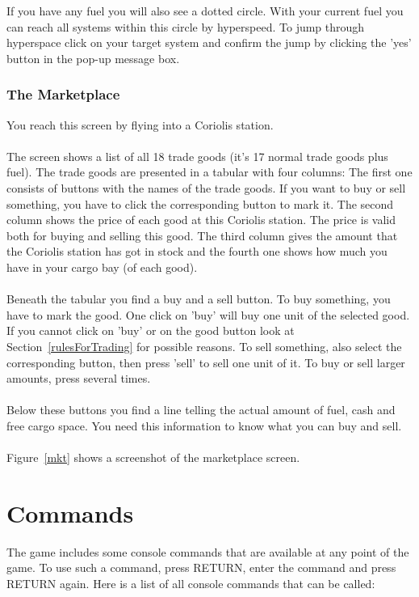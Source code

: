 \documentclass[a4paper,11pt]{article}
\begin{document}
If you have any fuel you will also see a dotted circle. With your current fuel you can reach all systems within this circle by hyperspeed. To jump through hyperspace click on your target system and confirm the jump by clicking the 'yes' button in the pop-up message box.

\subsubsection{The Marketplace}

You reach this screen by flying into a Coriolis station.\\
\ \\
The screen shows a list of all 18 trade goods (it's 17 normal trade goods plus fuel). 
The trade goods are presented in a tabular with four columns: The first one consists of buttons with the names of the trade goods. If you want to buy or sell something, you have to click the corresponding button to mark it.
The second column shows the price of each good at this Coriolis station. The price is valid both for buying and selling this good.
The third column gives the amount that the Coriolis station has got in stock and the fourth one shows how much you have in your cargo bay (of each good).\\
\ \\
Beneath the tabular you find a buy and a sell button. 
To buy something, you have to mark the good. One click on 'buy' will buy one unit of the selected good. If you cannot click on 'buy' or on the good button look at Section~\ref{rulesForTrading} for possible reasons.
To sell something, also select the corresponding button, then press 'sell' to sell one unit of it.
To buy or sell larger amounts, press several times.\\
\ \\
Below these buttons you find a line telling the actual amount of fuel, cash and free cargo space. You need this information to know what you can buy and sell.\\
\ \\
Figure~\ref{mkt} shows a screenshot of the marketplace screen.

\section{Commands\label{commands}}

The game includes some console commands that are available at any point of the game. To use such a command, press \textsc{RETURN}, enter the command and press \textsc{RETURN} again.
Here is a list of all console commands that can be called:
\end{document}
